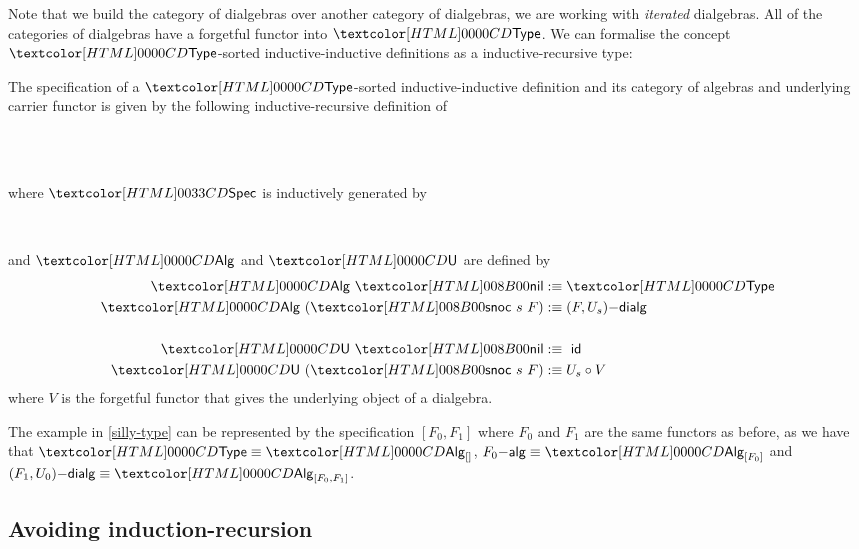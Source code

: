 Note that we build the category of dialgebras over another category of
dialgebras, \ie we are working with \emph{iterated} dialgebras. All of
the categories of dialgebras have a forgetful functor into $\Type$. We
can formalise the concept $\Type$-sorted inductive-inductive
definitions as a inductive-recursive type:
%
\begin{definition}
  \label{type-sorted-spec}
  The specification of a $\Type$-sorted inductive-inductive definition
  and its category of algebras and underlying carrier functor is given
  by the following inductive-recursive
  definition of
  \begin{sorts}
    \sortnamety{\specty}{\Type} \\
    \functy{\Alg}{\specty \to \Cat} \\
  \end{sorts}
  where $\specty$ is inductively generated by
  \begin{datatype}{\specty}{}
    \constr{\specnil}{\specty} \\
  \end{datatype}
  and $\Alg$ and $\Und$ are defined by
  \begin{align*}
    \Alg\ \specnil &\ddefeq \Type \\
    \Alg\ (\specsnoc\ s\ F) &\ddefeq \dialgcat{F}{U_s} \\
    \\
    \Und\ \specnil &\ddefeq\ \id \\
    \Und\ (\specsnoc\ s\ F) &\ddefeq U_s \circ V
  \end{align*}
  where $V$ is the forgetful functor that gives the underlying object of
  a dialgebra.
\end{definition}

\begin{example}
  The example in \cref{silly-type} can be represented by the
  specification $[F_0, F_1]$ where $F_0$ and $F_1$ are the same
  functors as before, as we have that $\Type \defeq \Alg_{[]}$,
  $\algcat{F_0} \defeq \Alg_{[F_0]}$ and
  $\dialgcat{F_1}{U_0} \defeq \Alg_{[F_0,F_1]}$.
\end{example}

\subsection{Avoiding induction-recursion}
\label{avoiding-induction-recursion}

